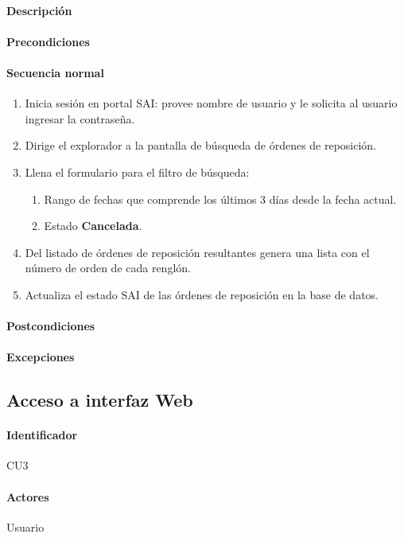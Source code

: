 \paragraph{Descripción}
\paragraph{Precondiciones}
\paragraph{Secuencia normal}
\begin{enumerate}
  \item Inicia sesión en portal SAI: provee nombre de usuario y le solicita al usuario ingresar la contraseña.
  \item Dirige el explorador a la pantalla de búsqueda de órdenes de reposición.
  \item Llena el formulario para el filtro de búsqueda:
  \begin{enumerate}
    \item Rango de fechas que comprende los últimos 3 días desde la fecha actual.
    \item Estado \textbf{Cancelada}.
  \end{enumerate}
  \item Del listado de órdenes de reposición resultantes genera una lista con el número de orden de cada renglón.
  \item Actualiza el estado SAI de las órdenes de reposición en la base de datos.
\end{enumerate}
\paragraph{Postcondiciones}
\paragraph{Excepciones}


\subsection{Acceso a interfaz Web}
\paragraph{Identificador}
CU3
\paragraph{Actores}
Usuario
